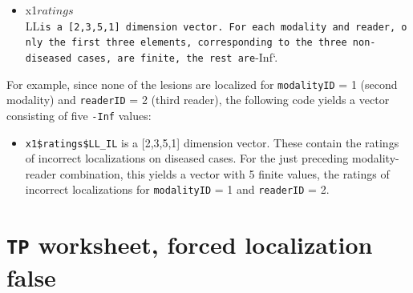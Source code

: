 \documentclass[
]{book}
\newenvironment{Shaded}{\begin{snugshade}}{\end{snugshade}}
\newcommand{\CommentTok}[1]{\textcolor[rgb]{0.56,0.35,0.01}{\textit{#1}}}
\newcommand{\DecValTok}[1]{\textcolor[rgb]{0.00,0.00,0.81}{#1}}
\newcommand{\NormalTok}[1]{#1}
\newcommand{\OperatorTok}[1]{\textcolor[rgb]{0.81,0.36,0.00}{\textbf{#1}}}
\providecommand{\tightlist}{%
  \setlength{\itemsep}{0pt}\setlength{\parskip}{0pt}}
\begin{document}
\begin{itemize}
\tightlist
\item
  x1\(ratings\)LL\texttt{is\ a\ {[}2,3,5,1{]}\ dimension\ vector.\ For\ each\ modality\ and\ reader,\ only\ the\ first\ three\ elements,\ corresponding\ to\ the\ three\ non-diseased\ cases,\ are\ finite,\ the\ rest\ are}-Inf`.
\end{itemize}

For example, since none of the lesions are localized for \texttt{modalityID} = 1 (second modality) and \texttt{readerID} = 2 (third reader), the following code yields a vector consisting of five \texttt{-Inf} values:

\begin{Shaded}
\end{Shaded}

\begin{itemize}
\tightlist
\item
  \texttt{x1\$ratings\$LL\_IL} is a {[}2,3,5,1{]} dimension vector. These contain the ratings of incorrect localizations on diseased cases. For the just preceding modality-reader combination, this yields a vector with 5 finite values, the ratings of incorrect localizations for \texttt{modalityID} = 1 and \texttt{readerID} = 2.
\end{itemize}

\begin{Shaded}
\end{Shaded}

\hypertarget{quick-start-lroc-tp2}{%
\section{\texorpdfstring{\texttt{TP} worksheet, forced localization false}{TP worksheet, forced localization false}}\label{quick-start-lroc-tp2}}
\end{document}
